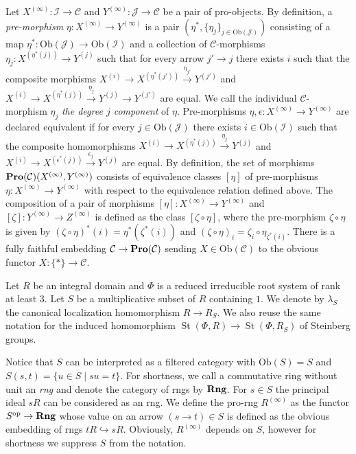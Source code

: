 \documentclass[oneside, 11pt]{amsart} \pdfoutput=1
\newcommand{\St}{\mathop{\mathrm{St}}\nolimits}
\numberwithin{equation}{section}
\theoremstyle{definition}
\newcommand{\catname}[1]{{\normalfont\textbf{#1}}} %
\begin{document}
Let $X^{(\infty)}\colon\mathcal{I}\to\mathcal{C}$ and $Y^{(\infty)}\colon\mathcal{J}\to\mathcal{C}$ be a pair of pro-objects.
By definition, a {\it pre-morphism} $\eta\colon X^{(\infty)} \to Y^{(\infty)}$ is a pair $(\eta^*, \{\eta_j\}_{j\in\mathrm{Ob}(\mathcal{J})})$ consisting of a map $\eta^*\colon \mathrm{Ob}(\mathcal{J})\to\mathrm{Ob}(\mathcal{I})$ and a collection of $\mathcal{C}$-morphisms $\eta_j\colon X^{(\eta^*(j))}\to Y^{(j)}$ such that for every arrow $j' \to j$ there exists $i$ such that the composite morphisms $X^{(i)} \to X^{(\eta^*(j'))} \xrightarrow{\eta_{j'}} Y^{(j')}$ and $X^{(i)} \to X^{(\eta^*(j))} \xrightarrow{\eta_j} Y^{(j)} \to Y^{(j')}$ are equal. We call the individual $\mathcal{C}$-morphism $\eta_j$ {\it the degree $j$ component} of $\eta$.
Pre-morphisms $\eta, \epsilon \colon X^{(\infty)} \to Y^{(\infty)}$ are declared equivalent if for every $j \in \mathrm{Ob}(\mathcal{J})$ there exists $i \in \mathrm{Ob}(\mathcal{I})$ such that the composite homomorphisms $X^{(i)} \to X^{(\eta^*(j))} \xrightarrow{\eta_j} Y^{(j)}$ and $X^{(i)} \to X^{(\epsilon^*(j))} \xrightarrow{\epsilon_j} Y^{(j)}$ are equal. By definition, the set of morphisms $\catname{Pro}(\mathcal{C})(X^{(\infty)}, Y^{(\infty)})$ consists of equivalence classes $[\eta]$ of pre-morphisms $\eta \colon X^{(\infty)} \to Y^{(\infty)}$ with respect to the equivalence relation defined above. The composition of a pair of morphisms \([\eta] \colon X^{(\infty)} \to Y^{(\infty)}\) and \([\zeta] \colon Y^{(\infty)} \to Z^{(\infty)}\) is defined as the class $[\zeta \circ \eta]$, where the pre-morphism \(\zeta \circ \eta\) is given by \((\zeta \circ \eta)^*(i) = \eta^*(\zeta^*(i))\) and \((\zeta\circ \eta)_{i} = \zeta_{i} \circ \eta_{\zeta^*(i)}\). There is a fully faithful embedding $\mathcal{C}\to\catname{Pro}(\mathcal{C})$ sending $X \in \mathrm{Ob}(\mathcal{C})$ to the obvious functor $X\colon \{ * \} \to \mathcal{C}$. 

Let $R$ be an integral domain and $\Phi$ is a reduced irreducible root system of rank at least $3$.
Let $S$ be a multiplicative subset of $R$ containing $1$. 
We denote by $\lambda_S$ the canonical localization homomorphism $R \to R_S$.
We also reuse the same notation for the induced homomorphism $\St(\Phi, R) \to \St(\Phi, R_S)$ of Steinberg groups.

Notice that $S$ can be interpreted as a filtered category with $\mathrm{Ob}(S) = S$ and $S(s, t) = \{ u \in S \mid su = t \}$.
For shortness, we call a commutative ring without unit an {\it rng} and denote the category of rngs by $\catname{Rng}$.
For $s\in S$ the principal ideal $sR$ can be considered as an rng. We define the pro-rng $R^{(\infty)}$ as the functor $S^\mathrm{op} \to \catname{Rng}$ whose value on an arrow $(s \to t)\in S$ is defined as the obvious embedding of rngs $tR \hookrightarrow sR$. Obviously, $R^{(\infty)}$ depends on $S$, however for shortness we suppress $S$ from the notation.
\end{document}
